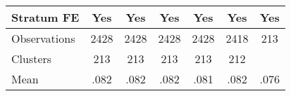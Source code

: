 {\begin{tabular}{l*{6}{c}}
Stratum FE      &      Yes         &      Yes         &      Yes         &      Yes         &      Yes         &      Yes         \\
\midrule
Observations    &     2428         &     2428         &     2428         &     2428         &     2418         &      213         \\
Clusters        &      213         &      213         &      213         &      213         &      212         &                  \\
Mean            &     .082         &     .082         &     .082         &     .081         &     .082         &     .076         \\
\bottomrule
\end{tabular}
}
